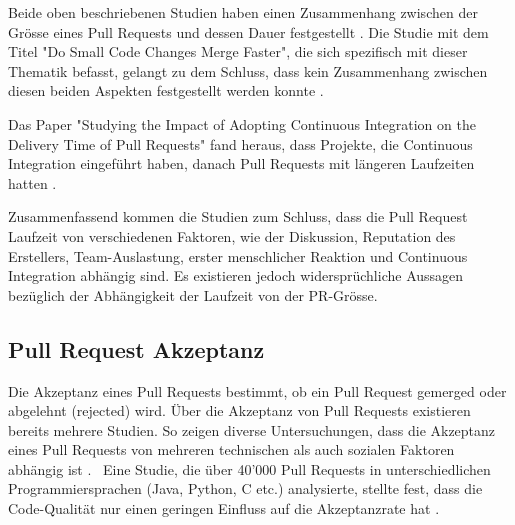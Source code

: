 Beide oben beschriebenen Studien haben einen Zusammenhang zwischen der Grösse eines Pull Requests und dessen Dauer festgestellt \parencite{yu_wait_2015}\parencite{hasan_understanding_2023}. Die Studie mit dem Titel "Do Small Code Changes Merge Faster", die sich spezifisch mit dieser Thematik befasst, gelangt zu dem Schluss, dass kein Zusammenhang zwischen diesen beiden Aspekten festgestellt werden konnte \parencite{kudrjavets_small_2022}.

Das Paper "Studying the Impact of Adopting Continuous Integration on the Delivery Time of Pull Requests" fand heraus, dass Projekte, die Continuous Integration eingeführt haben, danach Pull Requests mit längeren Laufzeiten hatten \parencite{bernardo_studying_2018}.

Zusammenfassend kommen die Studien zum Schluss, dass die Pull Request Laufzeit von verschiedenen Faktoren, wie der Diskussion, Reputation des Erstellers, Team-Auslastung, erster menschlicher Reaktion und Continuous Integration abhängig sind. Es existieren jedoch widersprüchliche Aussagen bezüglich der Abhängigkeit der Laufzeit von der PR-Grösse.



\subsection{Pull Request Akzeptanz}
Die Akzeptanz eines Pull Requests bestimmt, ob ein Pull Request gemerged oder abgelehnt (rejected) wird. Über die Akzeptanz von Pull Requests existieren bereits mehrere Studien.
So zeigen diverse Untersuchungen, dass die Akzeptanz eines Pull Requests von mehreren technischen als auch sozialen Faktoren abhängig ist \parencite{gousios_exploratory_2014}. \
Eine Studie, die über 40'000 Pull Requests in unterschiedlichen Programmiersprachen (Java, Python, C etc.) analysierte, stellte fest, dass die Code-Qualität nur einen geringen Einfluss auf die Akzeptanzrate hat \parencite{kuhejda_pull_2023}.

